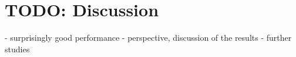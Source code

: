 \chapter{TODO: Discussion}
  - surprisingly good performance
    - perspective, discussion of the results
      - further studies

